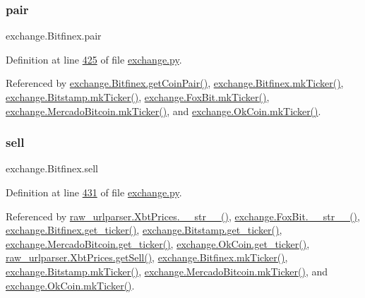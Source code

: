 \mbox{\label{classexchange_1_1_bitfinex_a901a5499667f1f2b391bc9dbbfe1c1c7}} 
\subsubsection{\texorpdfstring{pair}{pair}}
{\footnotesize\ttfamily exchange.\+Bitfinex.\+pair}



Definition at line \hyperlink{exchange_8py_source_l00425}{425} of file \hyperlink{exchange_8py_source}{exchange.\+py}.



Referenced by \hyperlink{exchange_8py_source_l00479}{exchange.\+Bitfinex.\+get\+Coin\+Pair()}, \hyperlink{exchange_8py_source_l00453}{exchange.\+Bitfinex.\+mk\+Ticker()}, \hyperlink{exchange_8py_source_l00525}{exchange.\+Bitstamp.\+mk\+Ticker()}, \hyperlink{exchange_8py_source_l00584}{exchange.\+Fox\+Bit.\+mk\+Ticker()}, \hyperlink{exchange_8py_source_l00665}{exchange.\+Mercado\+Bitcoin.\+mk\+Ticker()}, and \hyperlink{exchange_8py_source_l00730}{exchange.\+Ok\+Coin.\+mk\+Ticker()}.

\mbox{\label{classexchange_1_1_bitfinex_a9aebaf447f73e582f7bc626e526e0201}} 
\subsubsection{\texorpdfstring{sell}{sell}}
{\footnotesize\ttfamily exchange.\+Bitfinex.\+sell}



Definition at line \hyperlink{exchange_8py_source_l00431}{431} of file \hyperlink{exchange_8py_source}{exchange.\+py}.



Referenced by \hyperlink{raw__urlparser_8py_source_l00074}{raw\+\_\+urlparser.\+Xbt\+Prices.\+\_\+\+\_\+str\+\_\+\+\_\+()}, \hyperlink{exchange_8py_source_l00610}{exchange.\+Fox\+Bit.\+\_\+\+\_\+str\+\_\+\+\_\+()}, \hyperlink{exchange_8py_source_l00439}{exchange.\+Bitfinex.\+get\+\_\+ticker()}, \hyperlink{exchange_8py_source_l00511}{exchange.\+Bitstamp.\+get\+\_\+ticker()}, \hyperlink{exchange_8py_source_l00651}{exchange.\+Mercado\+Bitcoin.\+get\+\_\+ticker()}, \hyperlink{exchange_8py_source_l00716}{exchange.\+Ok\+Coin.\+get\+\_\+ticker()}, \hyperlink{raw__urlparser_8py_source_l00065}{raw\+\_\+urlparser.\+Xbt\+Prices.\+get\+Sell()}, \hyperlink{exchange_8py_source_l00453}{exchange.\+Bitfinex.\+mk\+Ticker()}, \hyperlink{exchange_8py_source_l00525}{exchange.\+Bitstamp.\+mk\+Ticker()}, \hyperlink{exchange_8py_source_l00665}{exchange.\+Mercado\+Bitcoin.\+mk\+Ticker()}, and \hyperlink{exchange_8py_source_l00730}{exchange.\+Ok\+Coin.\+mk\+Ticker()}.

